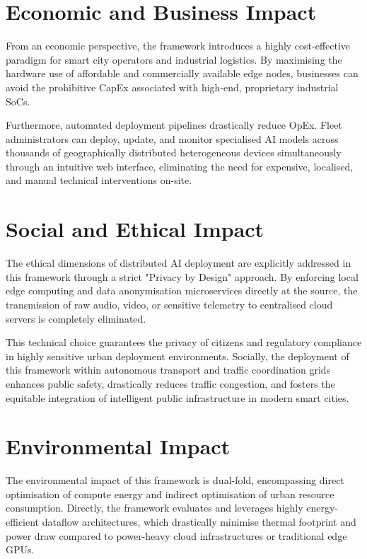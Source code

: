 \section{Economic and Business Impact}\label{sec:impact:economic}

From an economic perspective, the framework introduces a highly cost-effective paradigm for smart city operators and industrial logistics. By maximising the hardware use of affordable and commercially available edge nodes, businesses can avoid the prohibitive \gls{CapEx} associated with high-end, proprietary industrial \glspl{SoC}. 

Furthermore, automated deployment pipelines drastically reduce \gls{OpEx}. Fleet administrators can deploy, update, and monitor specialised \gls{AI} models across thousands of geographically distributed heterogeneous devices simultaneously through an intuitive web interface, eliminating the need for expensive, localised, and manual technical interventions on-site.

\section{Social and Ethical Impact}\label{sec:impact:social}

The ethical dimensions of distributed \gls{AI} deployment are explicitly addressed in this framework through a strict "Privacy by Design" approach. By enforcing local edge computing and data anonymisation microservices directly at the source, the transmission of raw audio, video, or sensitive telemetry to centralised cloud servers is completely eliminated. 

This technical choice guarantees the privacy of citizens and regulatory compliance in highly sensitive urban deployment environments. Socially, the deployment of this framework within autonomous transport and traffic coordination grids enhances public safety, drastically reduces traffic congestion, and fosters the equitable integration of intelligent public infrastructure in modern smart cities.

\section{Environmental Impact}\label{sec:impact:environmental}

The environmental impact of this framework is dual-fold, encompassing direct optimisation of compute energy and indirect optimisation of urban resource consumption. Directly, the framework evaluates and leverages highly energy-efficient dataflow architectures, which drastically minimise thermal footprint and power draw compared to power-heavy cloud infrastructures or traditional edge \glspl{GPU}. 

